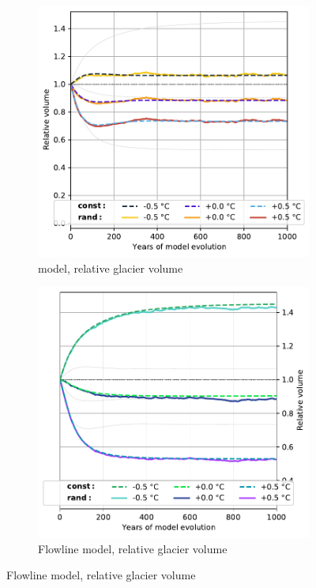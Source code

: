         \begin{figure}[htp]
          \centering
          \begin{subfigure}[b]{0.48\textwidth}
            \caption{\Vas{} model, relative glacier volume}
            \label{fig:histalp_commitment:volume_norm_const}
            \centering
            \includegraphics[width=\textwidth]{../plots/final_plots/time_series/histalp_commitment/volume_norm_vas.pdf}
          \end{subfigure}
          \hfill
          \begin{subfigure}[b]{0.48\textwidth}
            \caption{Flowline model, relative glacier volume}
            \label{fig:histalp_commitment:volume_norm_random}
            \centering
            \includegraphics[width=\textwidth]{../plots/final_plots/time_series/histalp_commitment/volume_norm_fl.pdf}

\end{subfigure}
\end{figure}

